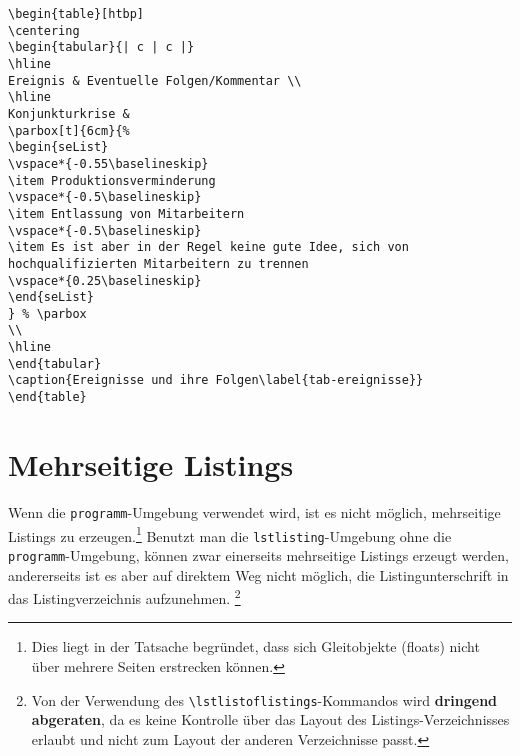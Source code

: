 \clearpage
\begin{programm}[htbp]
\begin{lstlisting}[keywordstyle=\color{black}]
\begin{table}[htbp]
\centering
\begin{tabular}{| c | c |}
\hline
Ereignis & Eventuelle Folgen/Kommentar \\
\hline
Konjunkturkrise &
\parbox[t]{6cm}{%
\begin{seList}
\vspace*{-0.55\baselineskip}
\item Produktionsverminderung
\vspace*{-0.5\baselineskip}
\item Entlassung von Mitarbeitern
\vspace*{-0.5\baselineskip}
\item Es ist aber in der Regel keine gute Idee, sich von
hochqualifizierten Mitarbeitern zu trennen
\vspace*{0.25\baselineskip}
\end{seList}
} % \parbox
\\
\hline
\end{tabular}
\caption{Ereignisse und ihre Folgen\label{tab-ereignisse}}
\end{table} 
\end{lstlisting}
\caption{Der Quelltext f\"ur die \vref{tab-ereignisse}\label{quelltext-tab-ereignisse}}
\end{programm}

\newpage
\section{Mehrseitige Listings}

Wenn die \verb+programm+-Umgebung verwendet wird, ist es nicht m\"oglich, mehrseitige 
Listings zu erzeugen.\footnote{Dies liegt in der Tatsache begr\"undet, dass sich Gleitobjekte (floats) nicht \"uber mehrere Seiten 
erstrecken k\"onnen.} 
Benutzt man die \verb+lstlisting+-Umgebung ohne die \verb+programm+-Umgebung, k\"onnen zwar einerseits mehrseitige Listings 
erzeugt werden, andererseits ist es aber auf direktem Weg nicht m\"oglich, die Listingunterschrift in das Listingverzeichnis aufzunehmen.%
\footnote{Von der Verwendung des \texttt{\textbackslash{}lstlistoflistings}-Kommandos wird \textbf{dringend abgeraten}, da es keine Kontrolle \"uber 
das Layout des Listings-Verzeichnisses erlaubt und nicht zum Layout der anderen Verzeichnisse passt.} 

